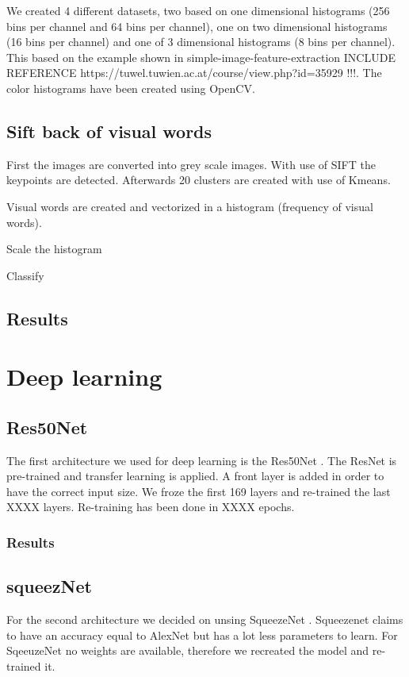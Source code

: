 \documentclass[11pt]{article}
\begin{document}
We created 4 different datasets, two based on one dimensional histograms (256 bins per channel and 64 bins per channel), one on two dimensional histograms (16 bins per channel) and one of 3 dimensional histograms (8 bins per channel). This based on the example shown in simple-image-feature-extraction INCLUDE REFERENCE https://tuwel.tuwien.ac.at/course/view.php?id=35929 !!!. The color histograms have been created using OpenCV. 

\subsection{Sift back of visual words}
First the images are converted into grey scale images. With use of SIFT the keypoints are detected. Afterwards 20 clusters are created with use of Kmeans.

Visual words are created and vectorized in a histogram (frequency of visual words). 

Scale the histogram 

Classify


\subsection{Results}

\section{Deep learning}


\subsection{Res50Net}
The first architecture we used for deep learning is the Res50Net \cite{Resnet}. The ResNet is pre-trained and transfer learning is applied. A front layer is added in order to have the correct input size. We froze the first 169 layers and re-trained the last XXXX layers. Re-training has been done in XXXX epochs.

\subsubsection{Results}

  


\subsection{squeezNet}
For the second architecture we decided on unsing SqueezeNet \cite{Sqeezenet}. Squeezenet claims to have an accuracy equal to AlexNet but has a lot less parameters to learn.  
For SqeeuzeNet no weights are available, therefore we recreated the model and re-trained it. 
\end{document}
